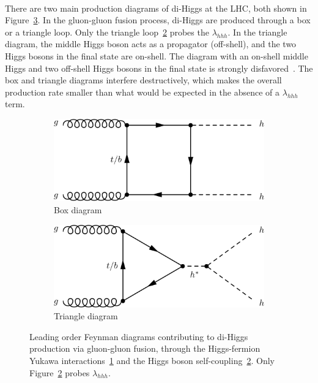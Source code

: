 \paragraph{}
There are two main production diagrams of di-Higgs at the LHC, both shown in Figure~\ref{fig:SM_HH}. In the gluon-gluon  fusion process, di-Higgs are produced through a box or a triangle loop. 
Only the triangle loop~\ref{fig:SM_HH_tri} probes the $\lambda_{hhh}$. 
In the triangle diagram, the middle Higgs boson acts as a propagator (off-shell), and the two Higgs bosons in the final state are on-shell. 
The diagram with an on-shell middle Higgs and two off-shell Higgs bosons in the final state is strongly disfavored~\cite{Pdg}.
The box and triangle diagrams interfere destructively, which makes the overall production rate smaller than what would be expected in the absence of a $\lambda_{hhh}$ term.

\begin{figure}[htbp!]
\centering
\captionsetup{justification=centering}
    \begin{subfigure}[b]{0.4\textwidth}
        \includegraphics[width=\textwidth]{figures/theory/SM_HH_box}
        \caption{Box diagram}
        \label{fig:SM_HH_box}
    \end{subfigure}
    \quad
    \begin{subfigure}[b]{0.4\textwidth}
        \includegraphics[width=\textwidth]{figures/theory/SM_HH_tri}
        \caption{Triangle diagram}
        \label{fig:SM_HH_tri}
    \end{subfigure}
\caption{Leading order Feynman diagrams contributing to di-Higgs production via gluon-gluon fusion, through the Higgs-fermion Yukawa interactions~\ref{fig:SM_HH_box} and the Higgs boson self-coupling~\ref{fig:SM_HH_tri}. Only Figure~\ref{fig:SM_HH_tri} probes $\lambda_{hhh}$.}
\label{fig:SM_HH}
\end{figure}

